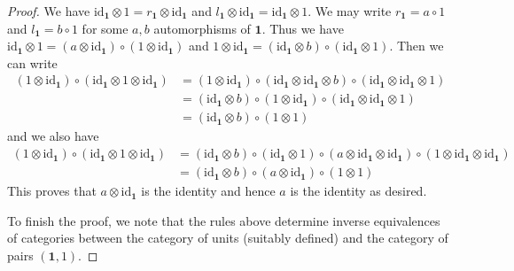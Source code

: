 \begin{proof}
\medskip\noindent
We have
$\text{id}_\mathbf{1} \otimes 1 = r_\mathbf{1} \otimes \text{id}_\mathbf{1}$
and
$l_\mathbf{1} \otimes \text{id}_\mathbf{1} = \text{id}_\mathbf{1} \otimes 1$.
We may write $r_\mathbf{1} = a \circ 1$ and $l_\mathbf{1} = b \circ 1$
for some $a, b$ automorphisms of $\mathbf{1}$. Thus we have
$\text{id}_\mathbf{1} \otimes 1 =
(a \otimes \text{id}_\mathbf{1}) \circ (1 \otimes \text{id}_\mathbf{1})$
and
$1 \otimes \text{id}_\mathbf{1} =
(\text{id}_\mathbf{1} \otimes b) \circ (\text{id}_\mathbf{1} \otimes 1)$.
Then we can write
\begin{align*}
(1 \otimes \text{id}_\mathbf{1}) \circ
(\text{id}_\mathbf{1} \otimes 1 \otimes \text{id}_\mathbf{1})
& =
(1 \otimes \text{id}_\mathbf{1}) \circ
(\text{id}_\mathbf{1} \otimes \text{id}_\mathbf{1} \otimes b)
\circ
(\text{id}_\mathbf{1} \otimes \text{id}_\mathbf{1} \otimes 1) \\
& =
(\text{id}_\mathbf{1} \otimes b) \circ
(1 \otimes \text{id}_\mathbf{1}) \circ
(\text{id}_\mathbf{1} \otimes \text{id}_\mathbf{1} \otimes 1) \\
& =
(\text{id}_\mathbf{1} \otimes b) \circ
(1 \otimes 1)
\end{align*}
and we also have
\begin{align*}
(1 \otimes \text{id}_\mathbf{1}) \circ
(\text{id}_\mathbf{1} \otimes 1 \otimes \text{id}_\mathbf{1})
& =
(\text{id}_\mathbf{1} \otimes b) \circ
(\text{id}_\mathbf{1} \otimes 1) \circ
(a \otimes \text{id}_\mathbf{1} \otimes \text{id}_\mathbf{1}) \circ
(1 \otimes \text{id}_\mathbf{1} \otimes \text{id}_\mathbf{1}) \\
& =
(\text{id}_\mathbf{1} \otimes b) \circ
(a \otimes \text{id}_\mathbf{1}) \circ
(1 \otimes 1)
\end{align*}
This proves that $a \otimes \text{id}_\mathbf{1}$ is the identity and
hence $a$ is the identity as desired.

\medskip\noindent
To finish the proof, we note that the rules above determine
inverse equivalences of categories between the category of units
(suitably defined) and the category of pairs $(\mathbf{1}, 1)$.
\end{proof}

